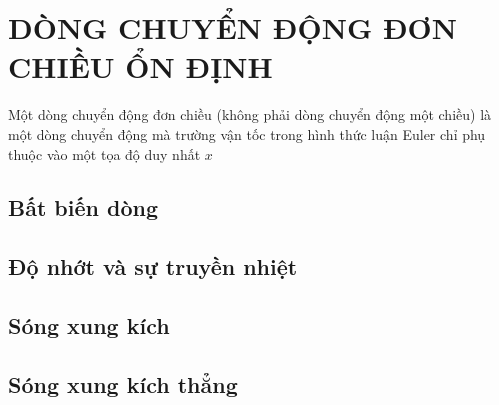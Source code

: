 \documentclass[../../main.tex]{subfiles}
\begin{document}
\chapter{DÒNG CHUYỂN ĐỘNG ĐƠN CHIỀU ỔN ĐỊNH}
    Một dòng chuyển động đơn chiều (không phải dòng chuyển động một chiều) là một dòng chuyển động mà trường vận tốc trong hình thức luận Euler chỉ phụ thuộc vào một tọa độ duy nhất $x$  
    \section{Bất biến dòng}

    \section{Độ nhớt và sự truyền nhiệt}
    
    \section{Sóng xung kích}

    \section{Sóng xung kích thẳng}
\end{document}
